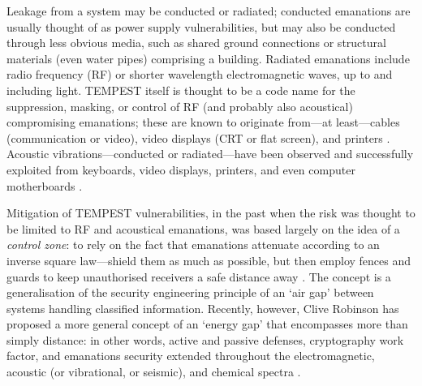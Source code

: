 \documentclass[a4paper,twoside,11pt,openany]{book}
\begin{document}
Leakage from a system may be conducted or radiated; conducted emanations are
usually thought of as power supply vulnerabilities, but may also be conducted
through less obvious media, such as shared ground connections or structural
materials (even water pipes)
comprising a building. Radiated emanations include radio frequency (RF) or
shorter wavelength electromagnetic waves, up to and including light. TEMPEST
itself is
thought to be a code name for the suppression, masking, or control of RF (and
probably also acoustical)
compromising emanations; these are known to originate from---at least---cables
(communication or video), video displays (CRT or flat screen), and printers
\cite{NSAtempest2007,vanEck1985,Smulders1990,Kuhn2002,Grzesiak2010a}. Acoustic
vibrations---conducted or radiated---have been observed and successfully
exploited from keyboards, video displays, printers, and even computer
motherboards \cite{Wright1987,Asonov2004,Zhuang2005,Berger2006,Backes2010,
Genkin2013,Genkin2018a,Kubiak2018f}.

Mitigation of TEMPEST vulnerabilities, in the past when the risk was thought to
be limited to RF and acoustical emanations, was based largely on the idea of a
\emph{control zone}: to rely on the fact that emanations attenuate according to
an inverse square law---shield them as much as possible, but then employ fences
and guards to keep unauthorised receivers a safe distance away \cite[\S
17.4.2]{Anderson2008a}. The concept is a generalisation of the security
engineering principle of an `air gap' between systems handling classified
information. Recently, however, Clive Robinson has proposed a more general
concept of an `energy gap' that encompasses more than simply distance: in other
words, active and passive defenses, cryptography work factor, and emanations
security extended throughout the electromagnetic, acoustic (or vibrational, or
seismic), and chemical spectra \cite{Robinson2018a,Robinson2018b}.
\end{document}
